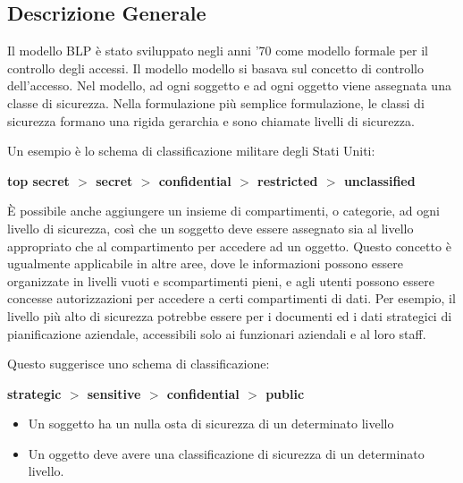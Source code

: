 \subsection{Descrizione Generale}
Il modello BLP è stato sviluppato negli anni '70 come modello formale per il controllo degli accessi. Il modello modello si basava sul concetto di controllo dell'accesso. Nel modello, ad ogni soggetto e ad ogni oggetto viene assegnata una classe di sicurezza. Nella formulazione più semplice formulazione, le classi di sicurezza formano una rigida gerarchia e sono chiamate livelli di sicurezza.

\singlespacing

Un esempio è lo schema di classificazione militare degli Stati Uniti:

\begin{center}
    \textbf{top secret $>$ secret $>$ confidential $>$ restricted $>$ unclassified}
\end{center}

È possibile anche aggiungere un insieme di compartimenti, o categorie, ad ogni livello di sicurezza, così che un soggetto deve essere assegnato sia al livello appropriato che al compartimento per accedere ad un oggetto. Questo concetto è ugualmente applicabile in altre aree, dove le informazioni possono essere organizzate in livelli vuoti e scompartimenti pieni, e agli utenti possono essere concesse autorizzazioni per accedere a certi compartimenti di dati. Per esempio, il livello più alto di sicurezza potrebbe essere per i documenti ed i dati strategici di pianificazione aziendale, accessibili solo ai funzionari aziendali e al loro staff.

\singlespacing

Questo suggerisce uno schema di classificazione:

\begin{center}
    \textbf{strategic $>$ sensitive $>$ confidential $>$ public}
\end{center}

\begin{itemize}

    \item Un soggetto ha un nulla osta di sicurezza di un determinato livello
    
    \item Un oggetto deve avere una classificazione di sicurezza di un determinato livello.
    
\end{itemize}

